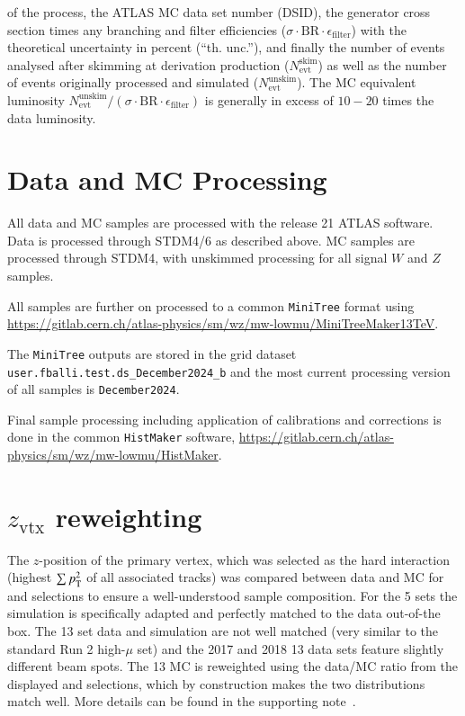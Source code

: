 \begin{table}[htbp]
\begin{center}
{     of the process, the ATLAS MC data set number (DSID), the generator
     cross section times any branching and
     filter efficiencies
     ($\sigma{\cdot} \text{BR}{\cdot}\epsilon_\mathrm{filter}$) with
     the theoretical uncertainty in percent (``th. unc.''), and
     finally the number of events analysed after skimming at
     derivation production ($N^\mathrm{skim}_\mathrm{evt}$) as well as
     the number of events originally processed and simulated
     ($N^\mathrm{unskim}_\mathrm{evt}$). The MC equivalent luminosity
     $N^\mathrm{unskim}_\mathrm{evt}/(\sigma{\cdot}\text{BR}{\cdot}\epsilon_\mathrm{filter})$
     is generally in excess of $10-20$ times the data luminosity.}
    \label{tab:samples5}
  \end{center}
\end{table}
\FloatBarrier

\section{Data and MC Processing}
\label{sec:processing}

All data and MC samples are processed with the release 21 ATLAS
software. Data is processed through STDM4/6 as described above.  MC
samples are processed through STDM4, with unskimmed processing for all
signal $W$ and $Z$ samples.

All samples are further on processed to a common \texttt{MiniTree}
format using\\ \href{https://gitlab.cern.ch/atlas-physics/sm/wz/mw-lowmu/MiniTreeMaker13TeV}{https://gitlab.cern.ch/atlas-physics/sm/wz/mw-lowmu/MiniTreeMaker13TeV}.

The \texttt{MiniTree} outputs are stored in the grid dataset
\texttt{user.fballi.test.ds\_December2024\_b}
and the most current processing version of all samples is
\texttt{December2024}.

Final sample processing including application of calibrations and
corrections is done in the common \texttt{HistMaker} software,
\href{https://gitlab.cern.ch/atlas-physics/sm/wz/mw-lowmu/HistMaker}{https://gitlab.cern.ch/atlas-physics/sm/wz/mw-lowmu/HistMaker}.

\section{$z_\mathrm{vtx}$ reweighting}
\label{sec:zvtx}

The $z$-position of the primary vertex, which was selected as the hard interaction (highest $\sum
p_{\text{T}}^2$ of all associated tracks) was compared between data and MC for \Zee and
\Zmm selections to ensure a well-understood sample composition. 
For the 5 \TeV{} sets the simulation is specifically adapted and
perfectly matched to the data out-of-the box. 
The 13 \TeV{} set data and simulation are not well matched (very similar to
the standard Run 2 high-$\mu$ set) and
the 2017 and 2018 13 \TeV{} data sets feature slightly different beam
spots. The 13 \TeV{} MC is reweighted using the data/MC ratio from
the displayed \Zee and \Zmm selections, which by construction makes
the two distributions match well. More details can be found in the \ptw supporting note~\cite{Kretzschmar:2657141}.

